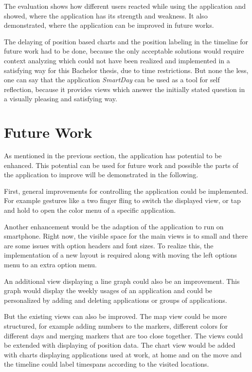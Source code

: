 The evaluation shows how different users reacted while using the application and showed, where the application has its strength and weakness. It also demonstrated, where the application can be improved in future works.

The  delaying of position based charts and the position labeling in the timeline for future work had to be done, because the only acceptable solutions would require context analyzing which could not have been realized and implemented in a satisfying way for this Bachelor thesis, due to time restrictions. But none the less, one can say that the application \emph{SmartDay} can be used as a tool for self reflection, because it provides views which answer the initially stated question in a visually pleasing and satisfying way.

\section{Future Work}
As mentioned in the previous section, the application has potential to be enhanced. This potential can be used for future work and possible the parts of the application to improve will be demonstrated in the following.

First,  general improvements for controlling the application could be implemented. For example gestures like a two finger fling to switch the displayed view, or tap and hold to open the color menu of a specific application.

Another enhancement would be the adaption of the application to run on smartphone. Right now, the visible space for the main views is to small and there are some issues with option headers and font sizes. To realize this, the implementation of a new layout is required along with moving the left options menu to an extra option menu.

An additional view displaying a line graph could also be an improvement. This graph would display the weekly usages of an application and could be personalized by adding and deleting applications or groups of applications.

But  the existing views can also be improved. The map view could be more structured, for example adding numbers to the markers, different colors for different days and merging markers that are too close together. The views could be extended with displaying of position data. The chart view would be added with charts displaying applications used at work, at home and on the move and the timeline could label timespans according to the visited locations. 

